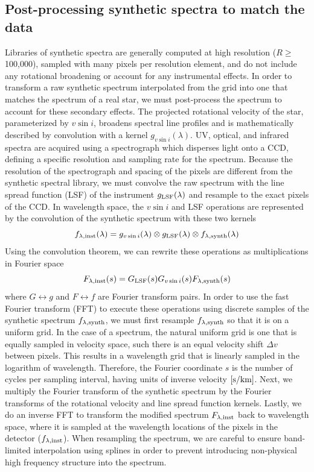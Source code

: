 \documentclass[iop,floatfix]{emulateapj}
\newcommand{\finst}{f_{\lambda, {\rm inst}}}
\newcommand{\fsynth}{f_{\lambda, {\rm synth}}}
\begin{document}
\subsection{Post-processing synthetic spectra to match the data}
Libraries of synthetic spectra are generally computed at high resolution ($R
 \geq $100,000), sampled with many pixels per resolution element, and do not
 include any rotational broadening or account for any instrumental effects. 
In order to transform a raw synthetic spectrum interpolated from the grid into
 one that matches the spectrum of a real star, we must post-process the spectrum
 to account for these secondary effects. 
The projected rotational velocity of the star, parameterized by $v \sin i$,
 broadens spectral line profiles and is mathematically described by convolution
 with a kernel $g_{v \sin i}(\lambda)$.  
UV, optical, and infrared spectra are acquired using a spectrograph which
 disperses light onto a CCD, defining a specific resolution and sampling rate
 for the spectrum. 
Because the resolution of the spectrograph and spacing of the pixels are
 different from the synthetic spectral library, we must convolve the raw
 spectrum with the line spread function (LSF) of the instrument $g_{\rm
 LSF}(\lambda)$ and resample to the exact pixels of the CCD. In wavelength
 space, the $v \sin i$ and LSF operations are represented by the convolution of
 the synthetic spectrum with these two kernels
\begin{equation}
  \finst(\lambda) = g_{v \sin i}(\lambda) \otimes g_{\rm LSF}(\lambda) 
   \otimes \fsynth(\lambda)
  \label{eqn:convolution}
\end{equation}
Using the convolution theorem, we can rewrite these operations as
 multiplications in Fourier space 
\begin{equation}
  F_{\lambda, {\rm inst}}(s) = G_{\rm LSF}(s) G_{v \sin i}(s) F_{\lambda, 
    {\rm synth}}(s)
\end{equation}
 where $G \leftrightarrow g$ and $F \leftrightarrow f$ are Fourier transform
 pairs. 
In order to use the fast Fourier transform (FFT) to execute these
 operations using discrete samples of the synthetic spectrum $\fsynth$, we must
 first resample $\fsynth$ so that it is on a uniform grid. 
In the case of a spectrum, the natural uniform grid is one that is equally
 sampled in velocity space, such there is an equal velocity shift $\Delta v$
 between pixels. This results in a wavelength grid that is linearly sampled in
 the logarithm of wavelength. 
Therefore, the Fourier coordinate $s$ is the number of cycles per sampling
 interval, having units of inverse velocity $[{\rm s}/{\rm km}]$. 
Next, we multiply the Fourier transform of the synthetic spectrum by the
 Fourier transforms of the rotational velocity and line spread function kernels.
Lastly, we do an inverse FFT to transform the modified spectrum $F_{\lambda,
 {\rm inst}}$ back to wavelength space, where it is sampled at the wavelength
 locations of the pixels in the detector ($\finst$). 
When resampling the spectrum, we are careful to ensure band-limited
 interpolation using splines in order to prevent introducing non-physical high
 frequency structure into the spectrum.
\end{document}
